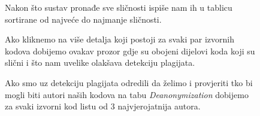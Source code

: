 \begin{figure}[H]
	\centering
	\caption{Nakon što sustav pronađe sve sličnosti ispiše nam ih u tablicu sortirane od najveće do najmanje sličnosti.}
\end{figure}

\begin{figure}[H]
	\centering
	\caption{Ako kliknemo na više detalja koji postoji za svaki par izvornih kodova dobijemo ovakav prozor gdje su obojeni dijelovi koda koji su slični i što nam uvelike olakšava detekciju plagijata.}
\end{figure}

\begin{figure}[H]
	\centering
	\caption{Ako smo uz detekciju plagijata odredili da želimo i provjeriti tko bi mogli biti autori naših kodova na tabu \textit{Deanonymization} dobijemo za svaki izvorni kod listu od 3 najvjerojatnija autora.}
\end{figure}



